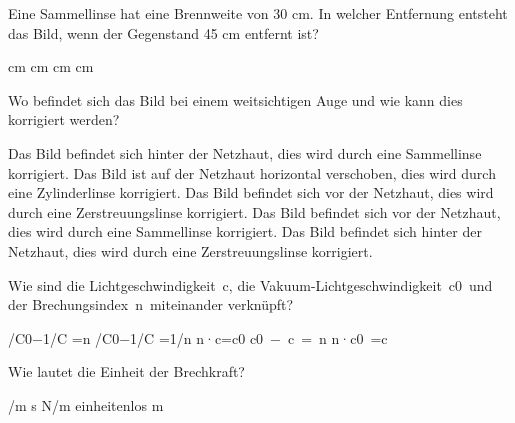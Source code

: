 \documentclass[11pt]{exam}
\begin{document}
\setlength{\voffset}{-0.5in}
\setlength{\headsep}{5pt}

\hspace{2mm}
 \hspace{5mm}
\vspace{4mm}

\begin{questions}

\question Eine Sammellinse hat eine Brennweite von 30 cm. In welcher Entfernung entsteht das Bild, wenn der Gegenstand 45 cm entfernt ist?

\begin{choices}
	\choice 90cm
	 cm
	 cm
	 cm
	 cm
\end{choices}

\vspace{3mm}\question Wo befindet sich das Bild bei einem weitsichtigen Auge und wie kann dies korrigiert werden?

\begin{choices}
	\choice Das Bild befindet sich hinter der Netzhaut, dies wird durch eine Sammellinse korrigiert.
	\choice Das Bild ist auf der Netzhaut horizontal verschoben, dies wird durch eine Zylinderlinse korrigiert.
	\choice Das Bild befindet sich vor der Netzhaut, dies wird durch eine Zerstreuungslinse korrigiert.
	\choice Das Bild befindet sich vor der Netzhaut, dies wird durch eine Sammellinse korrigiert.
	\choice Das Bild befindet sich hinter der Netzhaut, dies wird durch eine Zerstreuungslinse korrigiert.
\end{choices}

\vspace{3mm}\question Wie sind die Lichtgeschwindigkeit c, die Vakuum-Lichtgeschwindigkeit c0 und der Brechungsindex n miteinander verknüpft?

\begin{choices}
	 /C0−1/C =n
	 /C0−1/C =1/n
	\choice n·c=c0
	\choice c0 − c = n
	\choice n·c0 =c
\end{choices}

\vspace{3mm}\question Wie lautet die Einheit der Brechkraft?

\begin{choices}
	/m
	\choice s
	\choice N/m
	\choice einheitenlos
	\choice m
\end{choices}


\end{questions}
\end{document}
